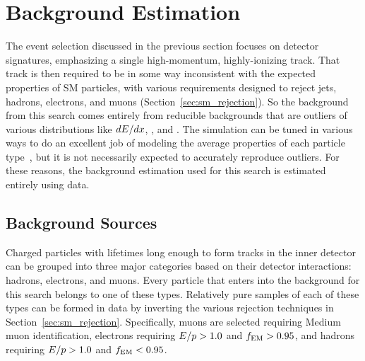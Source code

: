 \chapter{Background Estimation}

\label{ch:background}

The event selection discussed in the previous section focuses on detector signatures, emphasizing a single high-momentum, highly-ionizing track.
That track is then required to be in some way inconsistent with the expected properties of \ac{SM} particles, with various requirements designed to reject jets, hadrons, electrons, and muons (Section~\ref{sec:sm_rejection}).
So the background from this search comes entirely from reducible backgrounds that are outliers of various distributions like $dE/dx$, \emfrac, and \ptcone.
The simulation can be tuned in various ways to do an excellent job of modeling the average properties of each particle type~\cite{atlas_sim}, but it is not necessarily expected to accurately reproduce outliers.
For these reasons, the background estimation used for this search is estimated entirely using data.





\section{Background Sources}

Charged particles with lifetimes long enough to form tracks in the inner detector can be grouped into three major categories based on their detector interactions: hadrons, electrons, and muons. 
Every particle that enters into the background for this search belongs to one of these types.
Relatively pure samples of each of these types can be formed in data by inverting the various rejection techniques in Section~\ref{sec:sm_rejection}.
Specifically, muons are selected requiring Medium muon identification, electrons requiring $E/p > 1.0$ and $f_\mathrm{EM} > 0.95$, and hadrons requiring $E/p > 1.0$ and $f_\mathrm{EM} < 0.95$. 

